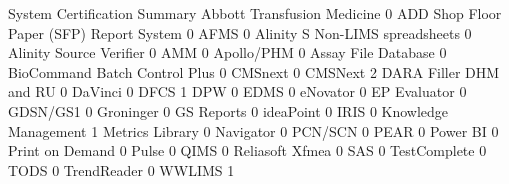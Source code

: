 \documentclass{article}
\begin{document}
\begin{Schunk}
\begin{Soutput}
                                           System Certification Summary
  Abbott Transfusion Medicine                                         0
  ADD Shop Floor Paper (SFP) Report System                            0
  AFMS                                                                0
  Alinity S Non-LIMS spreadsheets                                     0
  Alinity Source Verifier                                             0
  AMM                                                                 0
  Apollo/PHM                                                          0
  Assay File Database                                                 0
  BioCommand Batch Control Plus                                       0
  CMSnext                                                             0
  CMSNext                                                             2
  DARA Filler DHM and RU                                              0
  DaVinci                                                             0
  DFCS                                                                1
  DPW                                                                 0
  EDMS                                                                0
  eNovator                                                            0
  EP Evaluator                                                        0
  GDSN/GS1                                                            0
  Groninger                                                           0
  GS Reports                                                          0
  ideaPoint                                                           0
  IRIS                                                                0
  Knowledge Management                                                1
  Metrics Library                                                     0
  Navigator                                                           0
  PCN/SCN                                                             0
  PEAR                                                                0
  Power BI                                                            0
  Print on Demand                                                     0
  Pulse                                                               0
  QIMS                                                                0
  Reliasoft Xfmea                                                     0
  SAS                                                                 0
  TestComplete                                                        0
  TODS                                                                0
  TrendReader                                                         0
  WWLIMS                                                              1


\end{Soutput}
\end{Schunk}
\end{document}

